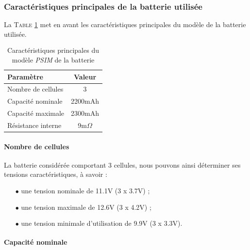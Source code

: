 			\subsubsection{Caractéristiques principales de la batterie utilisée}
			
			La \textsc{Table \ref{carac_lipo_psim}} met en avant les 
			caractéristiques principales du modèle de la batterie utilisée.
			
			\begin{table}[h]
				\begin{center}
					\begin{tabular}{l c}
						\textbf{Paramètre}		& \textbf{Valeur}	\\
						\hline
						Nombre de cellules 		& 3 				\\
						Capacité nominale		& 2200mAh 			\\
						Capacité maximale		& 2300mAh			\\
						Résistance interne		& 9m$\Omega$		\\
					\end{tabular}
				\end{center}
				\caption{Caractéristiques principales du modèle \textit{PSIM} de la batterie}
				\label{carac_lipo_psim}
			\end{table}
			
				\vspace{-0.5em}
			
				\paragraph{Nombre de cellules}
				
				La batterie considérée comportant 3 cellules, nous pouvons ainsi
				déterminer ses tensions caractéristiques, à savoir :
				\begin{itemize}
					\item[$\bullet$] une tension nominale de 11.1V (3 x 3.7V) ;
					\item[$\bullet$] une tension maximale de 12.6V (3 x 4.2V) ;
					\item[$\bullet$] une tension minimale d'utilisation de 9.9V (3 x 3.3V). 
				\end{itemize}
				
				\vspace{-0.5em}
				
				\paragraph{Capacité nominale}
				
